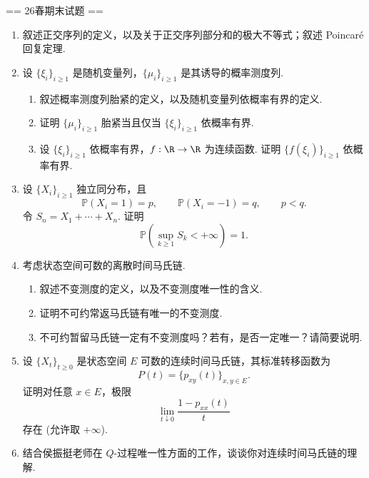 
== 26春期末试题 ==
\begin{enumerate}
    \item 叙述正交序列的定义，以及关于正交序列部分和的极大不等式；叙述 Poincar\'e 回复定理.
    \item 设 \(\{\xi_i\}_{i\ge1}\) 是随机变量列，\(\{\mu_i\}_{i\ge1}\) 是其诱导的概率测度列.
    \begin{enumerate}[label=(\arabic*)]
        \item 叙述概率测度列胎紧的定义，以及随机变量列依概率有界的定义.
        \item 证明 \(\{\mu_i\}_{i\ge1}\) 胎紧当且仅当 \(\{\xi_i\}_{i\ge1}\) 依概率有界.
        \item 设 \(\{\xi_i\}_{i\ge1}\) 依概率有界，\(f:\R\to\R\) 为连续函数. 证明 \(\{f(\xi_i)\}_{i\ge1}\) 依概率有界.
    \end{enumerate}
    \item 设 \(\{X_i\}_{i\geq 1}\) 独立同分布，且
    \[\mathbb{P}(X_i=1)=p, \qquad \mathbb{P}(X_i=-1)=q, \qquad p<q.\]
    令 \(S_n=X_1+\cdots+X_n\). 证明
    \[\mathbb{P}\left(\sup_{k\ge1}S_k<+\infty\right)=1.\]
    \item 考虑状态空间可数的离散时间马氏链.
    \begin{enumerate}[label=(\arabic*)]
        \item 叙述不变测度的定义，以及不变测度唯一性的含义.
        \item 证明不可约常返马氏链有唯一的不变测度.
        \item 不可约暂留马氏链一定有不变测度吗？若有，是否一定唯一？请简要说明.
    \end{enumerate}
    \item 设 \(\{X_t\}_{t\ge0}\) 是状态空间 \(E\) 可数的连续时间马氏链，其标准转移函数为
    \[P(t)=\{p_{xy}(t)\}_{x,y\in E}.\]
    证明对任意 \(x \in E\)，极限
    \[\lim_{t\downarrow0}\frac{1-p_{xx}(t)}{t}\]
    存在 (允许取 \(+\infty\)).
    \item 结合侯振挺老师在 \(Q\)-过程唯一性方面的工作，谈谈你对连续时间马氏链的理解.
\end{enumerate}

